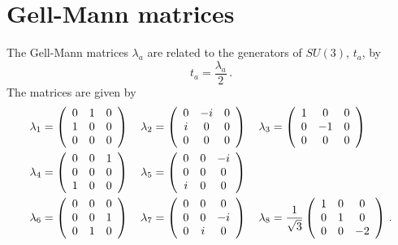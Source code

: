 \chapter{Gell-Mann matrices}\label{app:GellMann}
The Gell-Mann matrices $\lambda_a$ are related to the generators of $SU(3)$, $t_a$, by
%
\begin{equation}
t_a = \frac{\lambda_a}{2}\, .
\end{equation}
%
The matrices are given by
%
\begin{align*}
\lambda _ { 1 } &= \left( \begin{array} { c c c } { 0 } & { 1 } & { 0 } \\ { 1 } & { 0 } & { 0 } \\ { 0 } & { 0 } & { 0 } \end{array} \right) \quad \lambda _ { 2 } = \left( \begin{array} { c c c } { 0 } & { - i } & { 0 } \\ { i } & { 0 } & { 0 } \\ { 0 } & { 0 } & { 0 } \end{array} \right) \quad \lambda _ { 3 } = \left( \begin{array} { c c c } { 1 } & { 0 } & { 0 } \\ { 0 } & { - 1 } & { 0 } \\ { 0 } & { 0 } & { 0 } \end{array} \right)\\
\lambda _ { 4 } &= \left( \begin{array} { c c c } { 0 } & { 0 } & { 1 } \\ { 0 } & { 0 } & { 0 } \\ { 1 } & { 0 } & { 0 } \end{array} \right) \quad \lambda _ { 5 } = \left( \begin{array} { c c c } { 0 } & { 0 } & { - i } \\ { 0 } & { 0 } & { 0 } \\ { i } & { 0 } & { 0 } \end{array} \right)\\
\lambda _ { 6 } &= \left( \begin{array} { c c c } { 0 } & { 0 } & { 0 } \\ { 0 } & { 0 } & { 1 } \\ { 0 } & { 1 } & { 0 } \end{array} \right) \quad \lambda _ { 7 } = \left( \begin{array} { c c c } { 0 } & { 0 } & { 0 } \\ { 0 } & { 0 } & { - i } \\ { 0 } & { i } & { 0 } \end{array} \right) \quad \lambda _ { 8 } = \frac { 1 } { \sqrt { 3 } } \left( \begin{array} { c c c } { 1 } & { 0 } & { 0 } \\ { 0 } & { 1 } & { 0 } \\ { 0 } & { 0 } & { - 2 } \end{array} \right)\, .
\end{align*}
